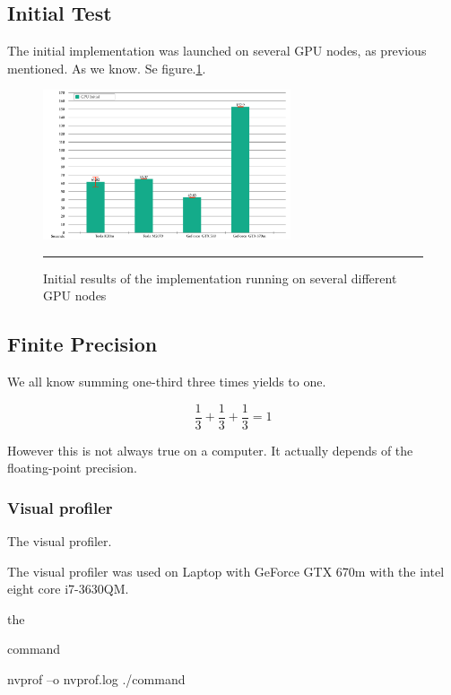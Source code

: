   

  
  
\subsection{Initial Test}

The initial implementation was launched on several GPU nodes, as previous mentioned.  As we know. Se figure.\ref{fig:iniresults}.

\begin{figure}[htbp]
	\centering
		\includegraphics[width=0.65\textwidth]{Figures/initial_results.png}
		\rule{35em}{0.2pt}
	\caption[Initial GPU results]{Initial results of the implementation running on several different GPU nodes}
	\label{fig:iniresults}
\end{figure}


\subsection{Finite Precision}

We all know summing one-third three times yields to one.

$$\dfrac{1}{3} + \dfrac{1}{3} + \dfrac{1}{3} = 1$$

 However this is not always true on a computer. It actually depends of the floating-point precision.
 
 
  


\subsubsection{Visual profiler}

The visual profiler.

The visual profiler was used on Laptop with GeForce GTX 670m with the intel eight core i7-3630QM.


the

command

 nvprof –o nvprof.log ./command
 
